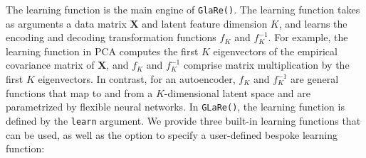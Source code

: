The learning function is the main engine of \texttt{GlaRe()}.
The learning function takes as arguments a data matrix $\mathbf{X}$ and latent feature dimension $K$, and learns the encoding and decoding transformation functions $f_K$ and $f_K^{-1}$.
For example, the learning function in PCA computes the first $K$ eigenvectors of the empirical covariance matrix of $\mathbf{X}$, and $f_K$ and $f_K^{-1}$ comprise matrix multiplication by the first $K$ eigenvectors.
In contrast, for an autoencoder, $f_K$ and $f_K^{-1}$ are general functions that map to and from a $K$-dimensional latent space and are parametrized by flexible neural networks.
In \texttt{GLaRe()}, the learning function is defined by the \texttt{learn} argument. 
We provide three built-in learning functions that can be used, as well as the option to specify a user-defined bespoke learning function:
